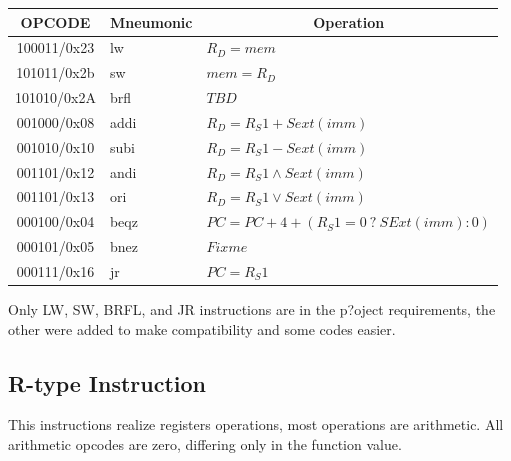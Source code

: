 \documentclass{article}
\begin{document}
  \FloatBarrier
  \begin{table}[H]
    \begin{center}
      \begin{tabular}[pos]{| c | l | l |} \hline 	
      \multicolumn{1}{|c|}{\cellcolor[gray]{0.9}\textbf{OPCODE}} & 
      \multicolumn{1}{c|}{\cellcolor[gray]{0.9}\textbf{Mneumonic}} & 
      \multicolumn{1}{c|}{\cellcolor[gray]{0.9}\textbf{Operation}} \\ \hline
	 100011/0x23 	& lw & $R_D = mem$ \\ \hline
	 101011/0x2b 	& sw & $mem = R_D$ \\ \hline
	 101010/0x2A 	& brfl & $TBD$ \\ \hline
	 001000/0x08 & addi & $R_D = R_S1 + Sext(imm)$ \\ \hline
	 001010/0x10 & subi & $R_D = R_S1 - Sext(imm)$ \\ \hline
	 001101/0x12 & andi & $R_D = R_S1 \land Sext(imm)$ \\ \hline
	 001101/0x13 & ori & $R_D = R_S1 \lor Sext(imm)$ \\ \hline
	 000100/0x04 & beqz & $PC = PC + 4 +(R_S1 = 0~?~SExt(imm): 0)$ \\ \hline
	 000101/0x05 & bnez & $Fixme$ \\ \hline
	 000111/0x16 & jr & $PC = R_S1$ \\ \hline
      \end{tabular}
    \end{center}
  \end{table} 

Only LW, SW, BRFL, and JR instructions are in the p?oject requirements, the other were added to make compatibility and some codes easier.
  
  \subsection{R-type Instruction}
This instructions realize registers operations, most operations are arithmetic. All arithmetic opcodes are zero, differing only in the function value.
\end{document}
